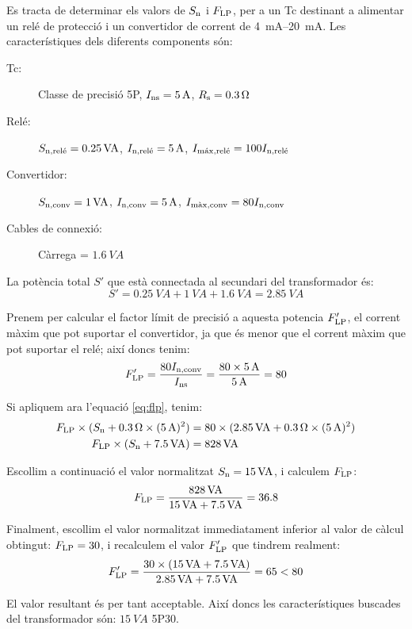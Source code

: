 \begin{exemple}
    Es tracta de determinar els valors de $S_\mathrm{n}$ i $F_\mathrm{LP}$,  per
    a un Tc destinant a alimentar  un relé de protecció i un convertidor
    de corrent de \SIrange{4}{20}{mA}. Les característiques
    dels diferents components són:
    \begin{description}
        \item [\hspace{5mm}Tc:] Classe de precisió  5P, $I_\mathrm{ns}=\SI{5}{A}$,
        $R_\mathrm{s}=\SI{0,3}{\ohm}$
        \item [\hspace{5mm}Relé:] $S_\mathrm{n,rel\acute{e}}=\SI{0,25}{VA}$,
        $I_\mathrm{n,rel\acute{e}}=\SI{5}{A}$, $I_\mathrm{m\acute{a}x,rel\acute{e}}=
        100 I_\mathrm{n,rel\acute{e}}$
        \item [\hspace{5mm}Convertidor:] $S_\mathrm{n,conv}=\SI{1}{VA}$,
        $I_\mathrm{n,conv}=\SI{5}{A}$, $I_\mathrm{m\grave{a}x,conv}=
        80 I_\mathrm{n,conv}$
        \item [\hspace{5mm}Cables de connexió:] Càrrega = $\SI{1,6}{VA}$
    \end{description}

    La potència total $S'$ que està connectada al secundari del transformador
    és:
    \[
        S' = \SI{0,25}{VA} + \SI{1}{VA} + \SI{1,6}{VA} = \SI{2,85}{VA}
    \]

    Prenem per calcular el factor límit de precisió  a aquesta potencia $F'_\mathrm{LP}$, el
    corrent màxim que pot suportar el convertidor, ja que és menor que el corrent màxim que pot suportar el relé; així doncs tenim:
    \[
        F'_\mathrm{LP} = \frac{80 I_\mathrm{n,conv}}{I_\mathrm{ns}} =
        \frac{80\times \SI{5}{A}}{\SI{5}{A}} = 80
    \]

    Si apliquem ara l'equació \eqref{eq:flp}, tenim:
    \begin{align*}
        F_\mathrm{LP}\times(S_\mathrm{n}+\SI{0,3}{\ohm} \times (\SI{5}{A})^2) &=
        80\times(\SI{2,85}{VA}+\SI{0,3}{\ohm} \times (\SI{5}{A})^2) \\
        F_\mathrm{LP}\times(S_\mathrm{n}+\SI{7,5}{VA}) &= \SI{828}{VA}
    \end{align*}

    Escollim a continuació el valor normalitzat $S_\mathrm{n}=
    \SI{15}{VA}$, i calculem $F_\mathrm{LP}$:
    \[
        F_\mathrm{LP} = \frac{\SI{828}{VA}}{\SI{15}{VA}+\SI{7,5}{VA}}
        = \num{36,8}
    \]

    Finalment, escollim el valor normalitzat immediatament inferior al valor
    de càlcul obtingut: $F_\mathrm{LP} = 30$, i
    recalculem el valor $F'_\mathrm{LP}$ que tindrem realment:
    \[
    F'_\mathrm{LP} = \frac{30\times(\SI{15}{VA} + \SI{7,5}{VA})}
    {\SI{2,85}{VA} + \SI{7,5}{VA}} = 65 < 80
    \]

    El valor resultant és per tant acceptable. Així doncs les
    característiques buscades del transformador són: $\SI{15}{VA}$ 5P30.
\end{exemple}



